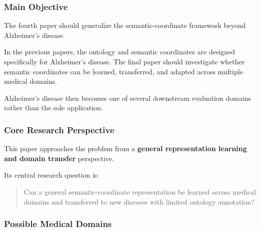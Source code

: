\documentclass{article}
\begin{document}




\subsubsection{Main Objective}

The fourth paper should generalize the semantic-coordinate framework beyond Alzheimer's disease.

In the previous papers, the ontology and semantic coordinates are designed specifically for Alzheimer's disease. The final paper should investigate whether semantic coordinates can be learned, transferred, and adapted across multiple medical domains.

Alzheimer's disease then becomes one of several downstream evaluation domains rather than the sole application.

\subsubsection{Core Research Perspective}

This paper approaches the problem from a \textbf{general representation learning and domain transfer} perspective.

Its central research question is:
\begin{quote}
Can a general semantic-coordinate representation be learned across medical domains and transferred to new diseases with limited ontology annotation?
\end{quote}

\subsubsection{Possible Medical Domains}
\end{document}
